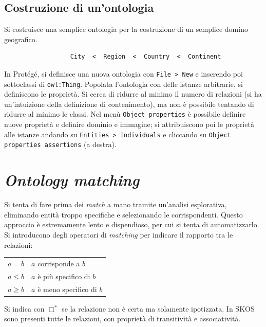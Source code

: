 \documentclass[11pt]{article}
\begin{document}
\subsection*{Costruzione di un'ontologia}
Si costruisce una semplice ontologia per la costruzione di un semplice domino geografico.
\begin{verbatim}
                  City  <  Region  <  Country  <  Continent
\end{verbatim}
In Protégé, si definisce una nuova ontologia con \verb|File > New| e inserendo poi sottoclassi di \verb|owl:Thing|.
Popolata l'ontologia con delle istanze arbitrarie, si definiscono le proprietà.
Si cerca di ridurre al minimo il numero di relazioni (si ha un'intuizione della definizione di contenimento), ma non è possibile tentando di ridurre al minimo le classi.
Nel menù \verb|Object properties| è possibile definire nuove proprietà e definire dominio e immagine; si attribuiscono poi le proprietà alle istanze andando su \verb|Entities > Individuals| e cliccando su \verb|Object properties assertions| (a destra).

\section{\textit{Ontology matching}}
Si tenta di fare prima dei \textit{match} a mano tramite un'analisi esplorativa, eliminando entità troppo specifiche e selezionando le corrispondenti.
Questo approccio è estremamente lento e dispendioso, per cui si tenta di automatizzarlo.
Si introducono degli operatori di \textit{matching} per indicare il rapporto tra le relazioni: \newline
\begin{center}
\begin{tabular}{cl}
  $a = b$ & $a$ corrisponde a $b$ \\
  $a \leq b$ & $a$ è più specifico di $b$ \\
  $a \geq b$ & $a$ è meno specifico di $b$
\end{tabular}
\end{center}

Si indica con $\Box^*$ se la relazione non è certa ma solamente ipotizzata.
In SKOS sono presenti tutte le relazioni, con proprietà di transitività e associatività.
\end{document}
